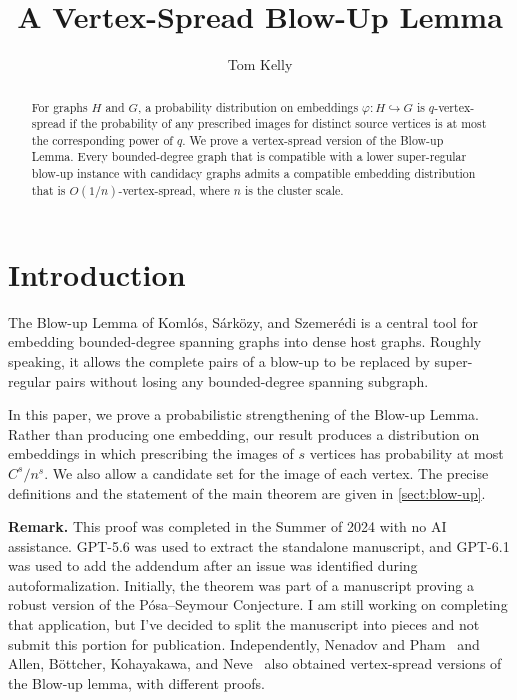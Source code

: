 \documentclass[11pt]{amsart}
\title{A Vertex-Spread Blow-Up Lemma}
\author{Tom Kelly}
\begin{document}
\begin{abstract}
For graphs $H$ and $G$, a probability distribution on embeddings
$\varphi:H\hookrightarrow G$ is $q$-vertex-spread if the probability of any
prescribed images for distinct source vertices is at most the corresponding
power of $q$.  We prove a vertex-spread version of the Blow-up Lemma.  Every
bounded-degree graph that is compatible with a lower super-regular blow-up
instance with candidacy graphs admits a compatible embedding distribution
that is $O(1/n)$-vertex-spread, where $n$ is the cluster scale.
\end{abstract}

\maketitle

\section{Introduction}\label{sec:introduction}

The Blow-up Lemma of Koml\'os, S\'ark\"ozy, and Szemer\'edi is a central tool
for embedding bounded-degree spanning graphs into dense host graphs.  Roughly
speaking, it allows the complete pairs of a blow-up to be replaced by
super-regular pairs without losing any bounded-degree spanning subgraph.

In this paper, we prove a probabilistic strengthening of the Blow-up Lemma.
Rather than producing one embedding, our result produces a distribution on
embeddings in which prescribing the images of $s$ vertices has probability at
most $C^s/n^s$.  We also allow a candidate set for the image of each vertex.
The precise definitions and the statement of the main theorem are given in
\cref{sect:blow-up}.

\medskip
\noindent\textbf{Remark.} This proof was completed in the Summer of 2024 with no AI assistance. GPT-5.6 was used to extract the standalone manuscript, and GPT-6.1 was used to add the addendum after an issue was identified during autoformalization. Initially, the theorem was part of a manuscript proving a robust version of the P\'osa--Seymour Conjecture. I am still working on completing that application, but I've decided to split the manuscript into pieces and not submit this portion for publication. Independently, Nenadov and Pham~\cite{NP24} and Allen, B\"{o}ttcher, Kohayakawa, and Neve~\cite{ABKN25} also obtained vertex-spread versions of the Blow-up lemma, with different proofs.
\end{document}
